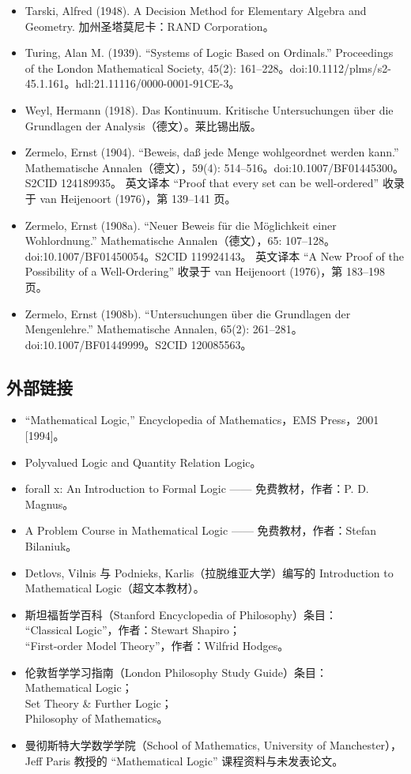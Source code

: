  \begin{itemize}
  \item Tarski, Alfred (1948). A Decision Method for Elementary Algebra and Geometry. 加州圣塔莫尼卡：RAND Corporation。
  \item Turing, Alan M. (1939). “Systems of Logic Based on Ordinals.” Proceedings of the London Mathematical Society, 45(2): 161–228。doi:10.1112/plms/s2-45.1.161。hdl:21.11116/0000-0001-91CE-3。
  \item Weyl, Hermann (1918). Das Kontinuum. Kritische Untersuchungen über die Grundlagen der Analysis（德文）。莱比锡出版。
  \item Zermelo, Ernst (1904). “Beweis, daß jede Menge wohlgeordnet werden kann.” Mathematische Annalen（德文），59(4): 514–516。doi:10.1007/BF01445300。S2CID 124189935。  
        英文译本 “Proof that every set can be well-ordered” 收录于 van Heijenoort (1976)，第 139–141 页。
  \item Zermelo, Ernst (1908a). “Neuer Beweis für die Möglichkeit einer Wohlordnung.” Mathematische Annalen（德文），65: 107–128。doi:10.1007/BF01450054。S2CID 119924143。  
        英文译本 “A New Proof of the Possibility of a Well-Ordering” 收录于 van Heijenoort (1976)，第 183–198 页。
  \item Zermelo, Ernst (1908b). “Untersuchungen über die Grundlagen der Mengenlehre.” Mathematische Annalen, 65(2): 261–281。doi:10.1007/BF01449999。S2CID 120085563。
 \end{itemize}
\subsection{外部链接}
\begin{itemize}
  \item “Mathematical Logic,” Encyclopedia of Mathematics，EMS Press，2001 [1994]。
  \item Polyvalued Logic and Quantity Relation Logic。
  \item forall x: An Introduction to Formal Logic —— 免费教材，作者：P. D. Magnus。
  \item A Problem Course in Mathematical Logic —— 免费教材，作者：Stefan Bilaniuk。
  \item Detlovs, Vilnis 与 Podnieks, Karlis（拉脱维亚大学）编写的 Introduction to Mathematical Logic（超文本教材）。
  \item 斯坦福哲学百科（Stanford Encyclopedia of Philosophy）条目：\\
“Classical Logic”，作者：Stewart Shapiro；\\
“First-order Model Theory”，作者：Wilfrid Hodges。\\
  \item 伦敦哲学学习指南（London Philosophy Study Guide）条目：\\
Mathematical Logic；\\
Set Theory \& Further Logic；\\
Philosophy of Mathematics。\\
  \item 曼彻斯特大学数学学院（School of Mathematics, University of Manchester），Jeff Paris 教授的 “Mathematical Logic” 课程资料与未发表论文。
\end{itemize}

